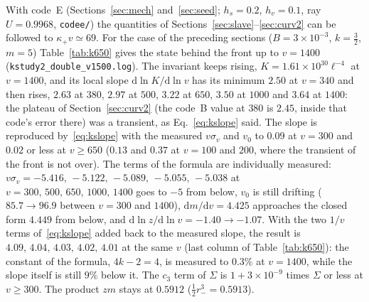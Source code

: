 \documentclass[11pt]{article}
\begin{document}
With code~E (Sections~\ref{sec:mech} and~\ref{sec:seed}; $h_s=0.2$, $h_v=0.1$, ray $U=0.9968$, \texttt{codee/}) the quantities of Sections~\ref{sec:slave}--\ref{sec:curv2} can be followed to $\kappa_+v\simeq69$. For the case of the preceding sections ($B=3\times10^{-3}$, $k=\tfrac32$, $m=5$) Table~\ref{tab:k650} gives the state behind the front up to $v=1400$ (\texttt{kstudy2\_double\_v1500.log}). The invariant keeps rising, $K=1.61\times10^{30}\ell^{-4}$ at $v=1400$, and its local slope $\mathrm d\ln K/\mathrm d\ln v$ has its minimum $2.50$ at $v=340$ and then rises, $2.63$ at $380$, $2.97$ at $500$, $3.22$ at $650$, $3.50$ at $1000$ and $3.64$ at $1400$: the plateau of Section~\ref{sec:curv2} (the code~B value at $380$ is $2.45$, inside that code's error there) was a transient, as Eq.~\eqref{eq:kslope} said. The slope is reproduced by~\eqref{eq:kslope} with the measured $v\sigma_v$ and $v_0$ to $0.09$ at $v=300$ and $0.02$ or less at $v\ge650$ ($0.13$ and $0.37$ at $v=100$ and $200$, where the transient of the front is not over). The terms of the formula are individually measured: $v\sigma_v=-5.416,\,-5.122,\,-5.089,\,-5.055,\,-5.038$ at $v=300,\,500,\,650,\,1000,\,1400$ goes to $-5$ from below, $v_0$ is still drifting ($85.7\to96.9$ between $v=300$ and $1400$), $\mathrm dm/\mathrm dv=4.425$ approaches the closed form $4.449$ from below, and $\mathrm d\ln z/\mathrm d\ln v=-1.40\to-1.07$. With the two $1/v$ terms of~\eqref{eq:kslope} added back to the measured slope, the result is $4.09,\,4.04,\,4.03,\,4.02,\,4.01$ at the same $v$ (last column of Table~\ref{tab:k650}): the constant of the formula, $4k-2=4$, is measured to $0.3\%$ at $v=1400$, while the slope itself is still $9\%$ below it. The $c_3$ term of $\Sigma$ is $1+3\times10^{-9}$ times $\Sigma$ or less at $v\ge300$. The product $zm$ stays at $0.5912$ ($\tfrac12r_-^{3}=0.5913$).
\end{document}
